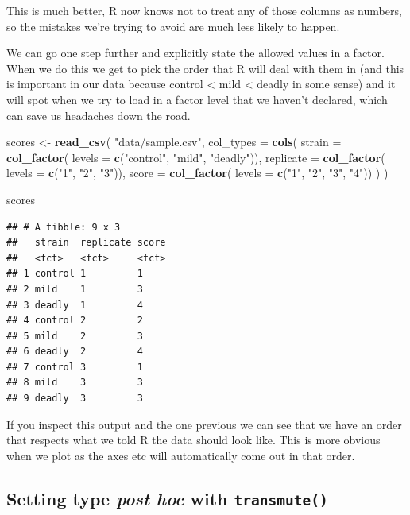 \documentclass[
]{book}
\newenvironment{Shaded}{\begin{snugshade}}{\end{snugshade}}
\newcommand{\DataTypeTok}[1]{\textcolor[rgb]{0.13,0.29,0.53}{#1}}
\newcommand{\KeywordTok}[1]{\textcolor[rgb]{0.13,0.29,0.53}{\textbf{#1}}}
\newcommand{\NormalTok}[1]{#1}
\newcommand{\StringTok}[1]{\textcolor[rgb]{0.31,0.60,0.02}{#1}}
\begin{document}
This is much better, R now knows not to treat any of those columns as numbers, so the mistakes we're trying to avoid are much less likely to happen.

We can go one step further and explicitly state the allowed values in a factor. When we do this we get to pick the order that R will deal with them in (and this is important in our data because control \textless{} mild \textless{} deadly in some sense) and it will spot when we try to load in a factor level that we haven't declared, which can save us headaches down the road.

\begin{Shaded}
\begin{Highlighting}[]
\NormalTok{scores <-}\StringTok{ }\KeywordTok{read_csv}\NormalTok{(}
  \StringTok{"data/sample.csv"}\NormalTok{,}
  \DataTypeTok{col_types =} \KeywordTok{cols}\NormalTok{(}
    \DataTypeTok{strain =} \KeywordTok{col_factor}\NormalTok{( }\DataTypeTok{levels =} \KeywordTok{c}\NormalTok{(}\StringTok{"control"}\NormalTok{, }\StringTok{"mild"}\NormalTok{, }\StringTok{"deadly"}\NormalTok{)),}
    \DataTypeTok{replicate =} \KeywordTok{col_factor}\NormalTok{( }\DataTypeTok{levels =} \KeywordTok{c}\NormalTok{(}\StringTok{"1"}\NormalTok{, }\StringTok{"2"}\NormalTok{, }\StringTok{"3"}\NormalTok{)),}
    \DataTypeTok{score =} \KeywordTok{col_factor}\NormalTok{( }\DataTypeTok{levels =} \KeywordTok{c}\NormalTok{(}\StringTok{"1"}\NormalTok{, }\StringTok{"2"}\NormalTok{, }\StringTok{"3"}\NormalTok{, }\StringTok{"4"}\NormalTok{))}
\NormalTok{  )}
\NormalTok{)}

\NormalTok{scores}
\end{Highlighting}
\end{Shaded}

\begin{verbatim}
## # A tibble: 9 x 3
##   strain  replicate score
##   <fct>   <fct>     <fct>
## 1 control 1         1    
## 2 mild    1         3    
## 3 deadly  1         4    
## 4 control 2         2    
## 5 mild    2         3    
## 6 deadly  2         4    
## 7 control 3         1    
## 8 mild    3         3    
## 9 deadly  3         3
\end{verbatim}

If you inspect this output and the one previous we can see that we have an order that respects what we told R the data should look like. This is more obvious when we plot as the axes etc will automatically come out in that order.

\hypertarget{setting-type-post-hoc-with-transmute}{%
\subsection{\texorpdfstring{Setting type \emph{post hoc} with \texttt{transmute()}}{Setting type post hoc with transmute()}}\label{setting-type-post-hoc-with-transmute}}
\end{document}
